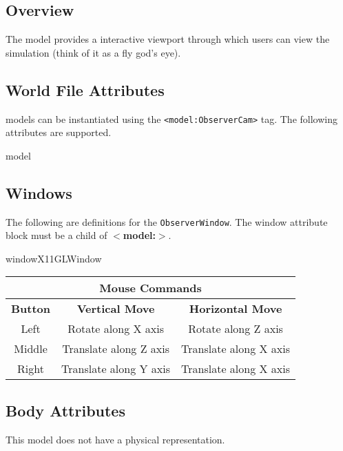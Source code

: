 
\subsection{Overview}

The {\tt \modelName } model provides a interactive viewport through
which users can view the simulation (think of it as a fly god's eye).

\subsection{World File Attributes}

{\tt \modelName} models can be instantiated using the
\verb+<model:ObserverCam>+ tag.  The following attributes are
supported.

\begin{xmlattrtable}{model}{\modelName}
\modeldefaults

\end{xmlattrtable}

\subsection{Windows}

The following are definitions for the {\tt ObserverWindow}. The window attribute block must be a child of {\bf$<$model:\modelName$>$}. 

\begin{xmlattrtable}{window}{X11GLWindow}
\end{xmlattrtable}


\begin{center}
\begin{tabular}{|c|c|c|}
\multicolumn{3}{c}{\bf Mouse Commands} \\
\hline
\bf Button & \bf Vertical Move & \bf Horizontal Move \\
\hline
Left & Rotate along X axis & Rotate along Z axis \\
\hline
Middle & Translate along Z axis & Translate along X axis \\
\hline
Right & Translate along Y axis & Translate along X axis \\
\hline
\end{tabular}
\end{center}


\subsection{Body Attributes}

This model does not have a physical representation.

